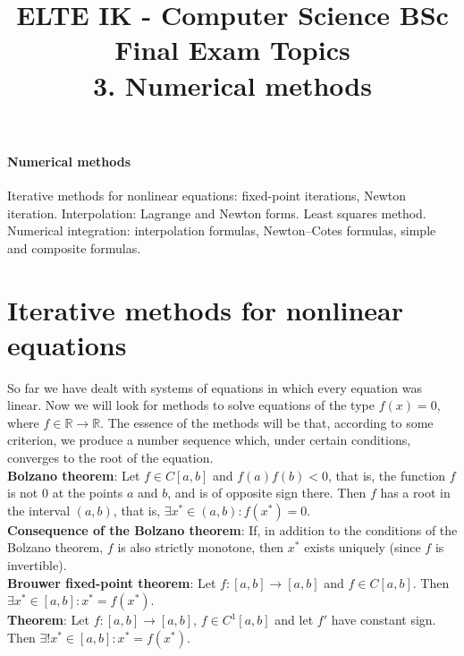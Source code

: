 \documentclass[margin=0px]{article}
\title{\textbf{{\Large ELTE IK - Computer Science BSc} \vspace{0.2cm} \\ {\huge Final Exam Topics}} \vspace{0.3cm} \\ 3. Numerical methods}
\author{}
\date{}
\newenvironment{tetel}[1]{\paragraph{#1 \\}}{}
\begin{document}
\maketitle

\begin{center}
\end{center}

\begin{tetel}{Numerical methods}
    Iterative methods for nonlinear equations: fixed-point iterations, Newton iteration. Interpolation: Lagrange and Newton forms. Least squares method. Numerical integration: interpolation formulas, Newton--Cotes formulas, simple and composite formulas.
\end{tetel}

\section{Iterative methods for nonlinear equations}

So far we have dealt with systems of equations in which every equation was linear. Now we will look for methods
to solve equations of the type $f(x) = 0$, where $f \in \mathbb{R} \to \mathbb{R}$. The essence of the methods
will be that, according to some criterion, we produce a number sequence which, under certain
conditions, converges to the root of the equation.\\

\noindent \textbf{Bolzano theorem}: Let $f \in C[a,b]$ and $f(a)f(b) <0$, that is, the function $f$ is not $0$
at the points $a$ and $b$, and is of opposite sign there. Then $f$ has a root in the interval $(a,b)$, that is,
$\exists x^{*} \in (a,b): f(x^{*}) = 0$.\\

\noindent \textbf{Consequence of the Bolzano theorem}: If, in addition to the conditions of the Bolzano theorem, $f$ is also strictly monotone, then
$x^{*}$ exists uniquely (since $f$ is invertible).\\

\noindent \textbf{Brouwer fixed-point theorem}: Let $f : [a,b] \to [a,b]$ and $f \in C[a,b]$. Then $\exists
    x^{*} \in [a,b]: x^{*} = f(x^{*})$.\\

\noindent \textbf{Theorem}: Let $f : [a,b] \to [a,b]$, $f \in C^{1}[a,b]$ and let $f'$ have constant sign. Then $\exists!
    x^{*} \in [a,b]: x^{*} = f(x^{*})$.\\
\end{document}
